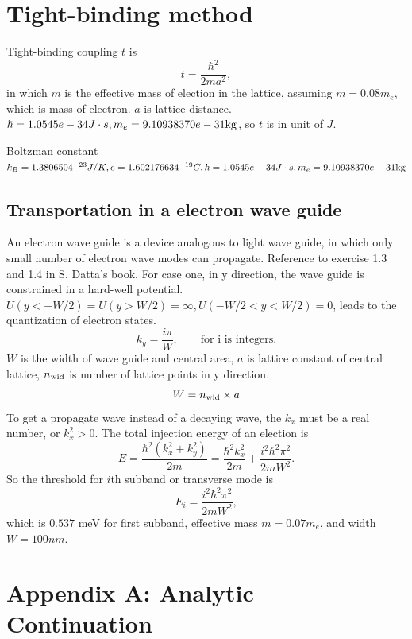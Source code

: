 \documentclass[aps,prb,superscriptaddress]{revtex4-2}
\begin{document}
\section{Tight-binding method}
Tight-binding coupling $t$ is 
\[
t = \frac{\hbar^{2}}{2ma^{2}},
\]
in which $m$ is the effective mass of election in the lattice, assuming $m=0.08m_{e}$, which is mass of electron. $a$ is lattice distance. $\hbar = 1.0545e-34J\cdot s, m_e = 9.10938370e-31\rm{kg}$, so $t$ is in unit of $J$.

Boltzman constant $k_B = 1.3806504^{-23}J/K, e = 1.602176634^{-19}C, \hbar = 1.0545e-34J\cdot s, m_e = 9.10938370e-31\rm{kg}$
\subsection{Transportation in a electron wave guide}
An electron wave guide is a device analogous to light wave guide, in which only small number of electron wave modes can propagate. Reference to exercise 1.3 and 1.4 in S. Datta's book. For case one, in y direction, the wave guide is constrained in a hard-well potential. $U(y < -W/2) = U(y > W/2) = \infty, U(-W/2 < y < W/2) = 0$, leads to the quantization of electron states.
\begin{equation}
k_{y} = \frac{i\pi}{W}, \qquad \text{for i is integers.}
\end{equation}
$W$ is the width of wave guide and central area, $a$ is lattice constant of central lattice, $n_{\rm{wid}}$ is number of lattice points in y direction.
\begin{equation}
W = n_{\rm{wid}}\times a
\end{equation}
To get a propagate wave instead of a decaying wave, the $k_{x}$ must be a real number, or $k_{x}^{2} > 0$. The total injection energy of an election is
\begin{equation}
E = \frac{\hbar^{2} (k_{x}^{2}+k_{y}^{2})}{2m} = \frac{\hbar^{2} k_{x}^{2}}{2m} + \frac{i^{2}\hbar^{2} \pi^{2}}{2mW^{2}}.
\end{equation}
So the threshold for $i$th subband or transverse mode is
\begin{equation}
E_{i} = \frac{i^{2}\hbar^{2} \pi^{2}}{2mW^{2}},
\end{equation}
which is $0.537$ meV for first subband, effective mass $m=0.07m_{e}$, and width $W = 100nm$.




\clearpage
\section*{Appendix A: Analytic Continuation}
\end{document}
